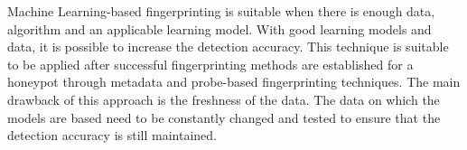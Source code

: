Machine Learning-based fingerprinting is suitable when there is enough data, algorithm and an applicable learning model. With good learning models and data, it is possible to increase the detection accuracy. This technique is suitable to be applied after successful fingerprinting methods are established for a honeypot through metadata and probe-based fingerprinting techniques. The main drawback of this approach is the freshness of the data. The data on which the models are based need to be constantly changed and tested to ensure that the detection accuracy is still maintained.  
